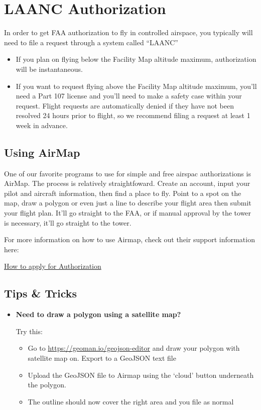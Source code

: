 \documentclass[
]{book}
\providecommand{\tightlist}{%
  \setlength{\itemsep}{0pt}\setlength{\parskip}{0pt}}
\begin{document}
\hypertarget{ch-LAANC}{%
\chapter{LAANC Authorization}\label{ch-LAANC}}

In order to get FAA authorization to fly in controlled airspace, you typically will need to file a request through a system called ``LAANC''

\begin{itemize}
\tightlist
\item
  If you plan on flying below the Facility Map altitude maximum, authorization will be instantaneous.
\item
  If you want to request flying above the Facility Map altitude maximum, you'll need a Part 107 license and you'll need to make a safety case within your request. Flight requests are automatically denied if they have not been resolved 24 hours prior to flight, so we recommend filing a request at least 1 week in advance.
\end{itemize}

\hypertarget{using-airmap}{%
\section{Using AirMap}\label{using-airmap}}

One of our favorite programs to use for simple and free airspac authorizations is AirMap. The process is relatively straightfoward. Create an account, input your pilot and aircraft information, then find a place to fly. Point to a spot on the map, draw a polygon or even just a line to describe your flight area then submit your flight plan. It'll go straight to the FAA, or if manual approval by the tower is necessary, it'll go straight to the tower.

For more information on how to use Airmap, check out their support information here:

\href{https://support.airmap.com/hc/en-us/articles/360030924511-How-to-apply-for-Authorization}{How to apply for Authorization}

\hypertarget{tips-tricks}{%
\section{Tips \& Tricks}\label{tips-tricks}}

\begin{itemize}
\item
  \textbf{Need to draw a polygon using a satellite map?}

  Try this:

  \begin{itemize}
  \tightlist
  \item
    Go to \url{https://geoman.io/geojson-editor} and draw your polygon with satellite map on. Export to a GeoJSON text file
  \item
    Upload the GeoJSON file to Airmap using the `cloud' button underneath the polygon.
  \item
    The outline should now cover the right area and you file as normal
  \end{itemize}
\end{itemize}
\end{document}
